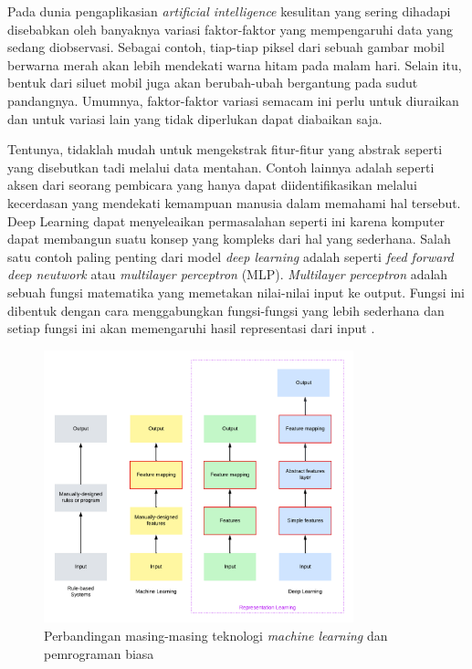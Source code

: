 Pada dunia pengaplikasian \emph{artificial intelligence} kesulitan yang sering dihadapi disebabkan oleh banyaknya variasi faktor-faktor yang mempengaruhi data yang sedang diobservasi. Sebagai contoh, tiap-tiap piksel dari sebuah gambar mobil berwarna merah akan lebih mendekati warna hitam pada malam hari. Selain itu, bentuk dari siluet mobil juga akan berubah-ubah bergantung pada sudut pandangnya. Umumnya, faktor-faktor variasi semacam ini perlu untuk diuraikan dan untuk variasi lain yang tidak diperlukan dapat diabaikan saja.

Tentunya, tidaklah mudah untuk mengekstrak fitur-fitur yang abstrak seperti yang disebutkan tadi melalui data mentahan. Contoh lainnya adalah seperti aksen dari seorang pembicara yang hanya dapat diidentifikasikan melalui kecerdasan yang mendekati kemampuan manusia dalam memahami hal tersebut. Deep Learning dapat menyeleaikan permasalahan seperti ini karena komputer dapat membangun suatu konsep yang kompleks dari hal yang sederhana. Salah satu contoh paling penting dari model \emph{deep learning} adalah seperti \emph{feed forward deep neutwork} atau \emph{multilayer perceptron} (MLP). \emph{Multilayer perceptron} adalah sebuah fungsi matematika yang memetakan nilai-nilai input ke output. Fungsi ini dibentuk dengan cara menggabungkan fungsi-fungsi yang lebih sederhana dan setiap fungsi ini akan memengaruhi hasil representasi dari input \citep{deepL}.

\begin{figure}[H]
	\centering
	
	\includegraphics[width=0.8\textwidth]{gambar/tipus_gambar_deep learning}
	
	\caption{Perbandingan masing-masing teknologi \emph{machine learning} dan pemrograman biasa}
	\label{fig:deeplearningdiagram}
\end{figure}

